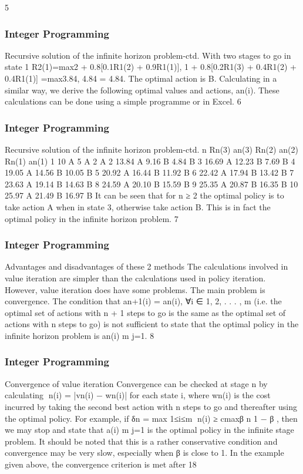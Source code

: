 \begin{frame}
5 \end{frame}  \begin{frame} \frametitle{Integer Programming}     
Recursive solution of the infinite horizon problem-ctd.
With two stages to go in state 1
R2(1)=max{2 + 0.8[0.1R1(2) + 0.9R1(1)],
1 + 0.8[0.2R1(3) + 0.4R1(2) + 0.4R1(1)]}
=max{3.84, 4.84} = 4.84.
The optimal action is B.
Calculating in a similar way, we derive the following optimal values
and actions, an(i). These calculations can be done using a simple
programme or in Excel.
6 \end{frame}  \begin{frame} \frametitle{Integer Programming}     
Recursive solution of the infinite horizon problem-ctd.
n Rn(3) an(3) Rn(2) an(2) Rn(1) an(1)
1 10 A 5 A 2 A
2 13.84 A 9.16 B 4.84 B
3 16.69 A 12.23 B 7.69 B
4 19.05 A 14.56 B 10.05 B
5 20.92 A 16.44 B 11.92 B
6 22.42 A 17.94 B 13.42 B
7 23.63 A 19.14 B 14.63 B
8 24.59 A 20.10 B 15.59 B
9 25.35 A 20.87 B 16.35 B
10 25.97 A 21.49 B 16.97 B
It can be seen that for n ≥ 2 the optimal policy is to take action A
when in state 3, otherwise take action B. This is in fact the
optimal policy in the infinite horizon problem.
7 \end{frame}  \begin{frame} \frametitle{Integer Programming}     
Advantages and disadvantages of these 2 methods
The calculations involved in value iteration are simpler than the
calculations used in policy iteration. However, value iteration does
have some problems.
The main problem is convergence. The condition that
an+1(i) = an(i), ∀i ∈ 1, 2, . . . , m (i.e. the optimal set of actions
with n + 1 steps to go is the same as the optimal set of actions
with n steps to go) is not sufficient to state that the optimal policy
in the infinite horizon problem is {an(i)}
m
j=1.
8 \end{frame}  \begin{frame} \frametitle{Integer Programming}     
Convergence of value iteration
Convergence can be checked at stage n by calculating
n(i) = |vn(i) − wn(i)| for each state i, where wn(i) is the cost
incurred by taking the second best action with n steps to go and
thereafter using the optimal policy.
For example, if
δn = max
1≤i≤m
{n(i)} ≥ cmaxβ
n
1 − β
,
then we may stop and state that {a(i)}
m
j=1 is the optimal policy in
the infinite stage problem.
It should be noted that this is a rather conservative condition and
convergence may be very slow, especially when β is close to 1. In
the example given above, the convergence criterion is met after 18

\end{frame}
